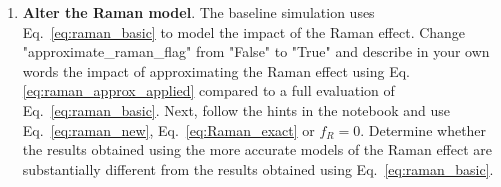 \begin{enumerate}
\item \textbf{Alter the Raman model}. The baseline simulation uses Eq.~\ref{eq:raman_basic} to model the impact of the Raman effect. Change "approximate\_raman\_flag" from "False" to "True" and describe in your own words the impact of approximating the Raman effect using Eq.\ref{eq:raman_approx_applied} compared to a full evaluation of Eq.~\ref{eq:raman_basic}. Next, follow the hints in the notebook and use Eq.~\ref{eq:raman_new}, Eq.~\ref{eq:Raman_exact} or $f_R=0$. Determine whether the results obtained using the more accurate models of the Raman effect are substantially different from the results obtained using Eq.~\ref{eq:raman_basic}.     

 

\end{enumerate}